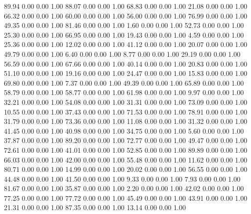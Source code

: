    89.94   0.00   0.00   1.00
   88.07   0.00   0.00   1.00
   68.83   0.00   0.00   1.00
   21.08   0.00   0.00   1.00
   66.32   0.00   0.00   1.00
   60.00   0.00   0.00   1.00
   56.00   0.00   0.00   1.00
   76.99   0.00   0.00   1.00
   49.35   0.00   0.00   1.00
   81.46   0.00   0.00   1.00
    1.60   0.00   0.00   1.00
   52.73   0.00   0.00   1.00
   25.30   0.00   0.00   1.00
   66.95   0.00   0.00   1.00
   19.43   0.00   0.00   1.00
    4.59   0.00   0.00   1.00
   25.36   0.00   0.00   1.00
   12.02   0.00   0.00   1.00
   41.12   0.00   0.00   1.00
   20.07   0.00   0.00   1.00
   49.79   0.00   0.00   1.00
    6.40   0.00   0.00   1.00
    8.77   0.00   0.00   1.00
   29.19   0.00   0.00   1.00
   56.59   0.00   0.00   1.00
   67.66   0.00   0.00   1.00
   40.14   0.00   0.00   1.00
   20.83   0.00   0.00   1.00
   51.10   0.00   0.00   1.00
   19.16   0.00   0.00   1.00
   24.47   0.00   0.00   1.00
   15.83   0.00   0.00   1.00
   69.80   0.00   0.00   1.00
    7.37   0.00   0.00   1.00
   49.39   0.00   0.00   1.00
   65.89   0.00   0.00   1.00
   58.79   0.00   0.00   1.00
   58.77   0.00   0.00   1.00
   61.98   0.00   0.00   1.00
    9.97   0.00   0.00   1.00
   32.21   0.00   0.00   1.00
   54.08   0.00   0.00   1.00
   31.31   0.00   0.00   1.00
   73.09   0.00   0.00   1.00
   10.55   0.00   0.00   1.00
   37.43   0.00   0.00   1.00
   71.53   0.00   0.00   1.00
   78.91   0.00   0.00   1.00
   31.79   0.00   0.00   1.00
   73.36   0.00   0.00   1.00
   11.08   0.00   0.00   1.00
   31.32   0.00   0.00   1.00
   41.45   0.00   0.00   1.00
   40.98   0.00   0.00   1.00
   34.75   0.00   0.00   1.00
    5.60   0.00   0.00   1.00
   37.87   0.00   0.00   1.00
   89.20   0.00   0.00   1.00
   72.77   0.00   0.00   1.00
   49.47   0.00   0.00   1.00
   72.61   0.00   0.00   1.00
   41.01   0.00   0.00   1.00
   52.85   0.00   0.00   1.00
   89.89   0.00   0.00   1.00
   66.03   0.00   0.00   1.00
   42.00   0.00   0.00   1.00
   55.48   0.00   0.00   1.00
   11.62   0.00   0.00   1.00
   80.71   0.00   0.00   1.00
   14.99   0.00   0.00   1.00
   20.02   0.00   0.00   1.00
   56.55   0.00   0.00   1.00
   44.48   0.00   0.00   1.00
   41.50   0.00   0.00   1.00
    9.33   0.00   0.00   1.00
    7.93   0.00   0.00   1.00
   81.67   0.00   0.00   1.00
   35.87   0.00   0.00   1.00
    2.20   0.00   0.00   1.00
   42.02   0.00   0.00   1.00
   77.25   0.00   0.00   1.00
   77.72   0.00   0.00   1.00
   45.49   0.00   0.00   1.00
   43.91   0.00   0.00   1.00
   21.31   0.00   0.00   1.00
   87.35   0.00   0.00   1.00
   13.14   0.00   0.00   1.00
